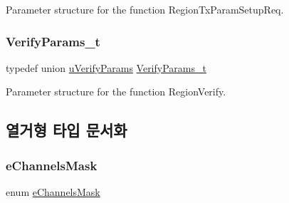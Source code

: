 Parameter structure for the function Region\+Tx\+Param\+Setup\+Req. \mbox{\label{group___r_e_g_i_o_n_ga966d97bc2f25df1c09e92e60ef652276}} 
\subsubsection{\texorpdfstring{Verify\+Params\+\_\+t}{VerifyParams\_t}}
{\footnotesize\ttfamily typedef union \mbox{\hyperlink{unionu_verify_params}{u\+Verify\+Params}} \mbox{\hyperlink{group___r_e_g_i_o_n_ga966d97bc2f25df1c09e92e60ef652276}{Verify\+Params\+\_\+t}}}

Parameter structure for the function Region\+Verify. 

\subsection{열거형 타입 문서화}
\mbox{\label{group___r_e_g_i_o_n_ga7a62e669f567fc160ad58210664bca9c}} 
\subsubsection{\texorpdfstring{e\+Channels\+Mask}{eChannelsMask}}
{\footnotesize\ttfamily enum \mbox{\hyperlink{group___r_e_g_i_o_n_ga7a62e669f567fc160ad58210664bca9c}{e\+Channels\+Mask}}}

